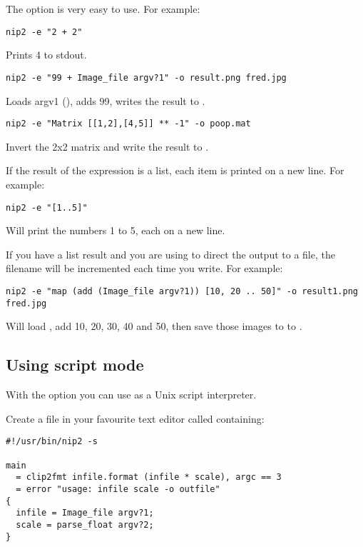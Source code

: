 The  option is very easy to use. For example:

\begin{verbatim}
nip2 -e "2 + 2"
\end{verbatim}

\noindent
Prints 4 to stdout.

\begin{verbatim}
nip2 -e "99 + Image_file argv?1" -o result.png fred.jpg
\end{verbatim}

\noindent
Loads argv1 (), adds 99, writes the result to .

\begin{verbatim}
nip2 -e "Matrix [[1,2],[4,5]] ** -1" -o poop.mat
\end{verbatim}

\noindent
Invert the 2x2 matrix and write the result to .

If the result of the expression is a list, each item is printed on a new
line. For example:

\begin{verbatim}
nip2 -e "[1..5]"
\end{verbatim}

\noindent
Will print the numbers 1 to 5, each on a new line.

If you have a list result and you are using  to direct the output to a
file, the filename will be incremented each time you write. For example:

\begin{verbatim}
nip2 -e "map (add (Image_file argv?1)) [10, 20 .. 50]" -o result1.png fred.jpg
\end{verbatim}

\noindent
Will load , add 10, 20, 30, 40 and 50, then save those images to
 to .

\subsection{Using script mode}

With the  option you can use \nip{} as a Unix script interpreter.

Create a file in your favourite text editor called  containing:

\begin{verbatim}
#!/usr/bin/nip2 -s

main
  = clip2fmt infile.format (infile * scale), argc == 3
  = error "usage: infile scale -o outfile"
{
  infile = Image_file argv?1;
  scale = parse_float argv?2;
}
\end{verbatim}

